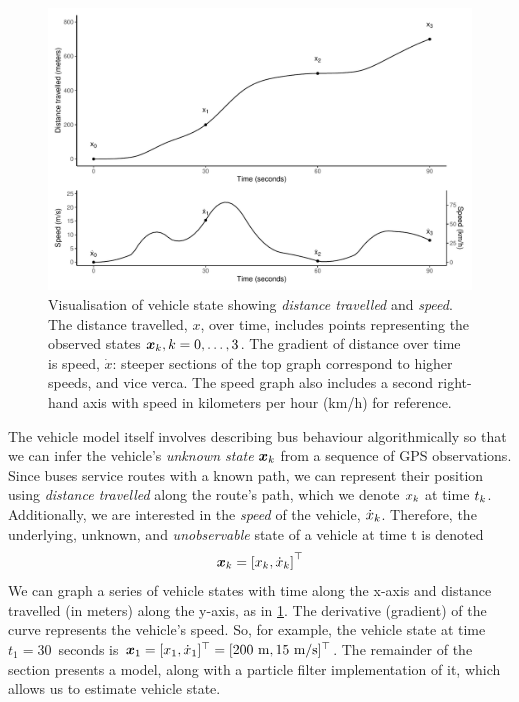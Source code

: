 \begin{knitrout}\small
{}\color{fgcolor}\begin{figure}

{\centering \includegraphics[width=\textwidth]{figure/vehicle_state-1} 

}

\caption[Visualisation of vehicle state showing \emph{distance travelled} and \emph{speed}]{Visualisation of vehicle state showing \emph{distance travelled} and \emph{speed}. The distance travelled, $x$, over time, includes points representing the observed states $\boldsymbol x_k, k=0,\ldots,3$. The gradient of distance over time is speed, $\dot x$: steeper sections of the top graph correspond to higher speeds, and vice verca. The speed graph also includes a second right-hand axis with speed in kilometers per hour (km/h) for reference.}\label{fig:vehicle_state}
\end{figure}


\end{knitrout}


The vehicle model itself involves describing bus behaviour algorithmically so that we can infer the vehicle's \emph{unknown state} $\boldsymbol x_k$ from a sequence of GPS observations. Since buses service routes with a known path, we can represent their position using \emph{distance travelled} along the route's path, which we denote $x_k$ at time $t_k$. Additionally, we are interested in the \emph{speed} of the vehicle, $\dot x_k$. Therefore, the underlying, unknown, and \emph{unobservable} state of a vehicle at time t is denoted
\begin{equation}
\label{eq:vehicle_state}
\boldsymbol x_k = \left[x_k, \dot x_k\right]^\top
\end{equation}
We can graph a series of vehicle states with time along the x-axis and distance travelled (in meters) along the y-axis, as in \cref{fig:vehicle_state}. The derivative (gradient) of the curve represents the vehicle's speed. So, for example, the vehicle state at time $t_1 = 30$~seconds is $\boldsymbol x_1 = [x_1, \dot x_1]^\top = [200~\text{m}, 15~\text{m/s}]^\top$. The remainder of the section presents a model, along with a particle filter implementation of it, which allows us to estimate vehicle state.

